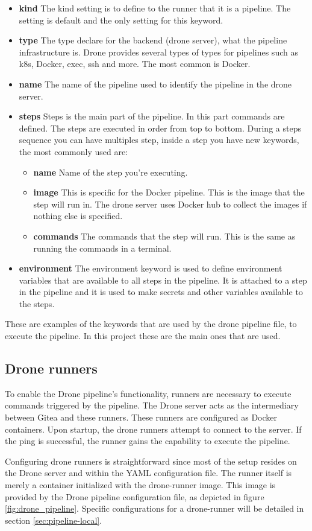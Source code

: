 \begin{itemize}
  \item \textbf{kind} 
  The kind setting is to define to the runner that it is a pipeline. The setting is default and the only setting for this 
  keyword.
  \item \textbf{type}
  The type declare for the backend (drone server), what the pipeline infrastructure is. Drone provides several types of types for pipelines such as 
  k8s\cite{kubenetes}, Docker, exec, ssh and more. The most common is Docker.
  \item \textbf{name}
  The name of the pipeline used to identify the pipeline in the drone server.
  \item \textbf{steps}
  Steps is the main part of the pipeline. In this part commands are defined. 
  The steps are executed in order from top to bottom.
  During a steps sequence you can have multiples step, inside a step you have new keywords, the most commonly used are:
    \begin{itemize}
      \item \textbf{name}
      Name of the step you're executing.
      \item \textbf{image}
      This is specific for the Docker pipeline. This is the image that the step will run in. 
      The drone server uses Docker hub to collect the images if nothing else is specified.
      \item \textbf{commands}
      The commands that the step will run. This is the same as running the commands in a terminal.
    \end{itemize}
  \item{\textbf{environment}}
  The environment keyword is used to define environment variables that are available to all steps in the pipeline.
  It is attached to a step in the pipeline and it is used to make secrets and other variables available to the steps.
\end{itemize}

These are examples of the keywords that are used by the drone pipeline file, to execute the pipeline.
In this project these are the main ones that are used.
\subsection{Drone runners}
To enable the Drone pipeline's functionality, runners are necessary to execute commands triggered by the pipeline. 
The Drone server acts as the intermediary between Gitea and these runners. These runners are configured as Docker containers. 
Upon startup, the drone runners attempt to connect to the server. If the ping is successful, the runner gains the capability to execute the pipeline.

Configuring drone runners is straightforward since most of the setup resides on the Drone server and within the YAML configuration file. 
The runner itself is merely a container initialized with the drone-runner image. This image is provided by the Drone pipeline configuration file, as depicted in figure \ref{fig:drone_pipeline}. 
Specific configurations for a drone-runner will be detailed in section \ref{sec:pipeline-local}.